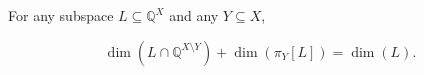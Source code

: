For any subspace $L \subseteq \mathbb{Q}^X$ and any $Y \subseteq X$,

$$\dim(L \cap \mathbb{Q}^{X \setminus Y}) + \dim(\pi_Y[L]) = \dim(L).$$
